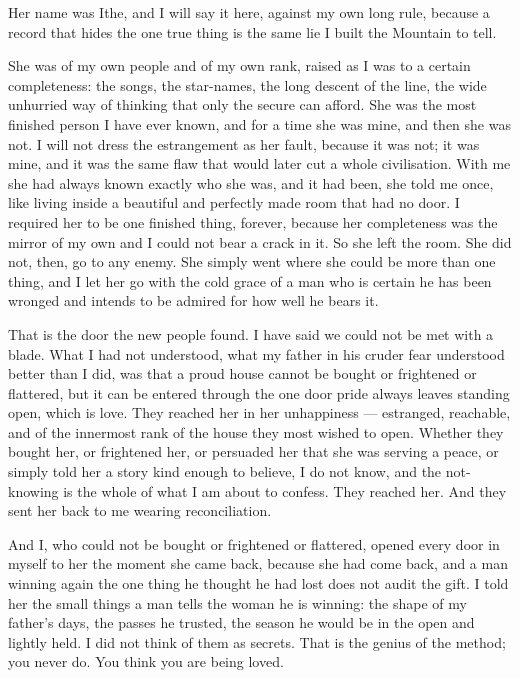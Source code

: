 \ornament

Her name was Ithe, and I will say it here, against my own long rule, because a record that hides the one true thing is the same lie I built the Mountain to tell.\par

She was of my own people and of my own rank, raised as I was to a certain completeness: the songs, the star-names, the long descent of the line, the wide unhurried way of thinking that only the secure can afford. She was the most finished person I have ever known, and for a time she was mine, and then she was not. I will not dress the estrangement as her fault, because it was not; it was mine, and it was the same flaw that would later cut a whole civilisation. With me she had always known exactly who she was, and it had been, she told me once, like living inside a beautiful and perfectly made room that had no door. I required her to be one finished thing, forever, because her completeness was the mirror of my own and I could not bear a crack in it. So she left the room. She did not, then, go to any enemy. She simply went where she could be more than one thing, and I let her go with the cold grace of a man who is certain he has been wronged and intends to be admired for how well he bears it.\par

That is the door the new people found. I have said we could not be met with a blade. What I had not understood, what my father in his cruder fear understood better than I did, was that a proud house cannot be bought or frightened or flattered, but it can be entered through the one door pride always leaves standing open, which is love. They reached her in her unhappiness --- estranged, reachable, and of the innermost rank of the house they most wished to open. Whether they bought her, or frightened her, or persuaded her that she was serving a peace, or simply told her a story kind enough to believe, I do not know, and the not-knowing is the whole of what I am about to confess. They reached her. And they sent her back to me wearing reconciliation.\par

And I, who could not be bought or frightened or flattered, opened every door in myself to her the moment she came back, because she had come back, and a man winning again the one thing he thought he had lost does not audit the gift. I told her the small things a man tells the woman he is winning: the shape of my father's days, the passes he trusted, the season he would be in the open and lightly held. I did not think of them as secrets. That is the genius of the method; you never do. You think you are being loved.\par

